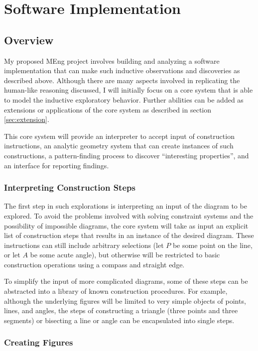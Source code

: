 \chapter{Software Implementation}

\section{Overview}

My proposed MEng project involves building and analyzing a software
implementation that can make such inductive observations and
discoveries as described above.  Although there are many aspects
involved in replicating the human-like reasoning discussed, I will
initially focus on a core system that is able to model the inductive
exploratory behavior.  Further abilities can be added as extensions or
applications of the core system as described in section
\ref{sec:extension}.

This core system will provide an interpreter to accept input of
construction instructions, an analytic geometry system that can create
instances of such constructions, a pattern-finding process to discover
``interesting properties'', and an interface for reporting findings.

\subsection{Interpreting Construction Steps}

The first step in such explorations is interpreting an input of the
diagram to be explored.  To avoid the problems involved with solving
constraint systems and the possibility of impossible diagrams, the
core system will take as input an explicit list of construction steps
that results in an instance of the desired diagram.  These
instructions can still include arbitrary selections (let $P$ be some
point on the line, or let $A$ be some acute angle), but otherwise will
be restricted to basic construction operations using a compass and
straight edge.

To simplify the input of more complicated diagrams, some of these
steps can be abstracted into a library of known construction
procedures.  For example, although the underlying figures will be
limited to very simple objects of points, lines, and angles, the steps
of constructing a triangle (three points and three segments) or
bisecting a line or angle can be encapsulated into single steps.

\subsection{Creating Figures}

